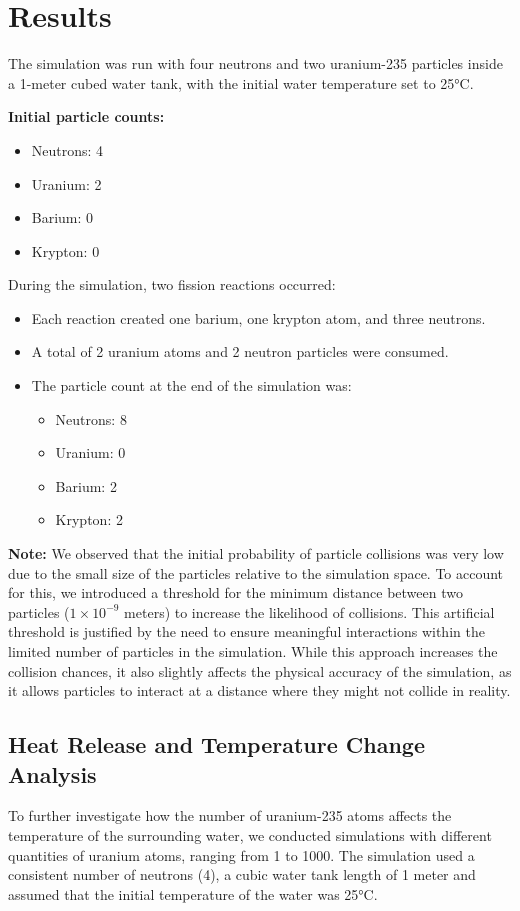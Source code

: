 \documentclass[twocolumn, 11pt]{article}
\begin{document}
\section*{Results}
The simulation was run with four neutrons and two uranium-235 particles inside a 1-meter cubed water tank, with the initial water temperature set to 25°C.

\textbf{Initial particle counts:}
\begin{itemize}
    \item Neutrons: 4
    \item Uranium: 2
    \item Barium: 0
    \item Krypton: 0
\end{itemize}

During the simulation, two fission reactions occurred:
\begin{itemize}
    \item Each reaction created one barium, one krypton atom, and three neutrons.
    \item A total of 2 uranium atoms and 2 neutron particles were consumed.
    \item The particle count at the end of the simulation was:
        \begin{itemize}
            \item Neutrons: 8
            \item Uranium: 0
            \item Barium: 2
            \item Krypton: 2
        \end{itemize}
\end{itemize}

\textbf{Note:} We observed that the initial probability of particle collisions was very low due to the small size of the particles relative to the simulation space. To account for this, we introduced a threshold for the minimum distance between two particles (\(1 \times 10^{-9}\) meters) to increase the likelihood of collisions. This artificial threshold is justified by the need to ensure meaningful interactions within the limited number of particles in the simulation. While this approach increases the collision chances, it also slightly affects the physical accuracy of the simulation, as it allows particles to interact at a distance where they might not collide in reality.

\subsection*{Heat Release and Temperature Change Analysis}
To further investigate how the number of uranium-235 atoms affects the temperature of the surrounding water, we conducted simulations with different quantities of uranium atoms, ranging from 1 to 1000. The simulation used a consistent number of neutrons (4), a cubic water tank length of 1 meter and assumed that the initial temperature of the water was 25°C. 
\end{document}
